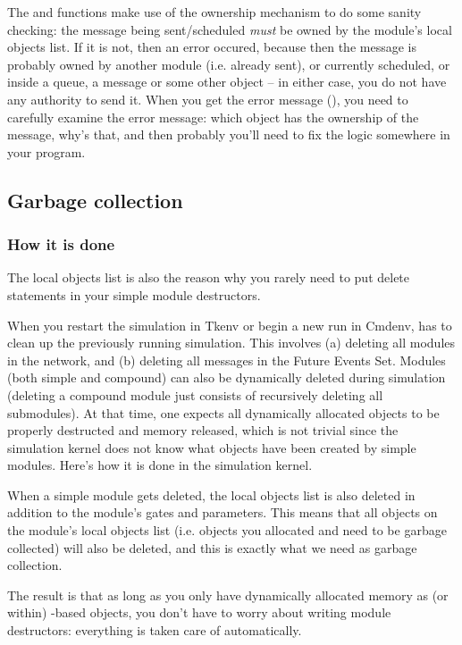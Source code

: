The  and  functions make use
of the ownership mechanism to do some sanity checking:
the message being sent/scheduled \textit{must} be owned
by the module's local objects list.
If it is not, then an error occured, because then the message is
probably owned by another module (i.e. already sent), or
currently scheduled, or inside a queue, a message or some
other object -- in either case, you do not have any authority
to send it. When you get the error message (),
you need to carefully examine the error message: which object has the ownership
of the message, why's that, and then probably you'll need to fix the logic somewhere
in your program.



\subsection{Garbage collection}
\label{sec:ch-sim-lib:garbage-collection}

\subsubsection{How it is done}

The local objects list is also the reason why you rarely need to
put delete statements in your simple module destructors.

When you restart the simulation in Tkenv or begin a new run in Cmdenv,
{\opp} has to clean up the previously running simulation.
This involves (a) deleting all modules in the network, and
(b) deleting all messages in the Future Events Set.
Modules (both simple and compound) can also be dynamically deleted
during simulation (deleting a compound module just consists
of recursively deleting all submodules). At that time,
one expects all dynamically allocated objects to be properly
destructed and memory released, which is not trivial since the
simulation kernel does not know what objects have been created
by simple modules. Here's how it is done in the simulation kernel.

When a simple module gets deleted, the local objects list is also
deleted in addition to the module's gates and parameters.
This means that all objects on the module's local objects list
(i.e. objects you allocated and need to be garbage collected)
will also be deleted, and this is exactly what we need as garbage
collection.

The result is that as long as you only have dynamically allocated
memory as (or within) -based objects,
you don't have to worry about writing module destructors:
everything is taken care of automatically.


